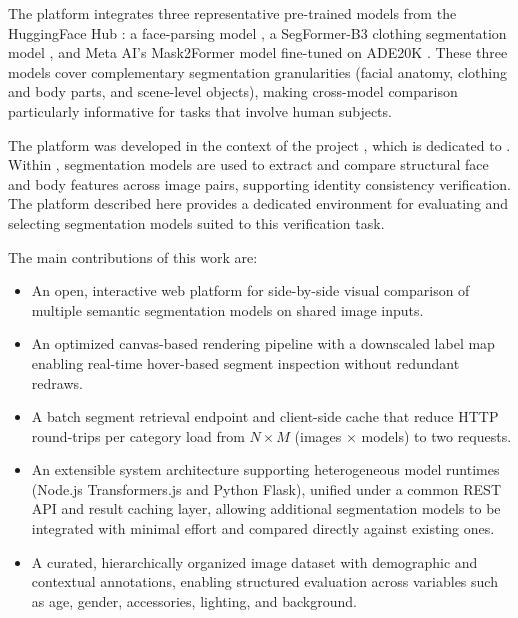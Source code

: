 \documentclass[conference,a4paper,flushend]{iaria}
\begin{document}
The platform integrates three representative pre-trained models from the HuggingFace Hub \cite{wolf2020huggingfacestransformersstateoftheartnatural}: a face-parsing model \cite{jonathandinu2023faceparsing}, a SegFormer-B3 clothing segmentation model \cite{afridi2023segformerb3}, and Meta AI's Mask2Former model fine-tuned on ADE20K \cite{cheng2022maskedattentionmasktransformeruniversal}. These three models cover complementary segmentation granularities (facial anatomy, clothing and body parts, and scene-level objects), making cross-model comparison particularly informative for tasks that involve human subjects.


The platform was developed in the context of the  project , which is dedicated to . Within , segmentation models are used to extract and compare structural face and body features across image pairs, supporting identity consistency verification. The platform described here provides a dedicated environment for evaluating and selecting segmentation models suited to this verification task.

The main contributions of this work are:
\begin{itemize}
  \item An open, interactive web platform for side-by-side visual comparison of multiple semantic segmentation models on shared image inputs.
  \item An optimized canvas-based rendering pipeline with a downscaled label map enabling real-time hover-based segment inspection without redundant redraws.
  \item A batch segment retrieval endpoint and client-side cache that reduce HTTP round-trips per category load from $N \times M$ (images $\times$ models) to two requests.
  \item An extensible system architecture supporting heterogeneous model runtimes (Node.js Transformers.js and Python Flask), unified under a common REST API and result caching layer, allowing additional segmentation models to be integrated with minimal effort and compared directly against existing ones.
  \item A curated, hierarchically organized image dataset with demographic and contextual annotations, enabling structured evaluation across variables such as age, gender, accessories, lighting, and background.
\end{itemize}
\end{document}
